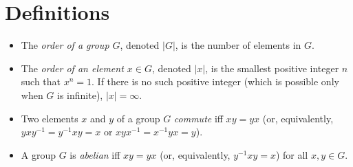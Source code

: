 \documentclass{article}
\begin{document}
\section{Definitions}
\begin{itemize}
\item The \emph{order of a group $G$}, denoted $|G|$, is the number of elements in $G$.  %
\item The \emph{order of an element $x\in G$}, denoted $|x|$, is the smallest positive integer $n$ such that $x^n = 1$.  If there is no such positive integer (which is possible only when $G$ is infinite), $|x| = \infty$.
\item Two elements $x$ and $y$ of a group $G$ \emph{commute} iff $xy = yx$ (or, equivalently, $yxy^{-1} = y^{-1}xy = x$ or $xyx^{-1} = x^{-1}yx = y$).
\item A group $G$ is \emph{abelian} iff $xy = yx$ (or, equivalently, $y^{-1}xy = x$) for all $x,y\in G$.


\end{itemize}
\end{document}
